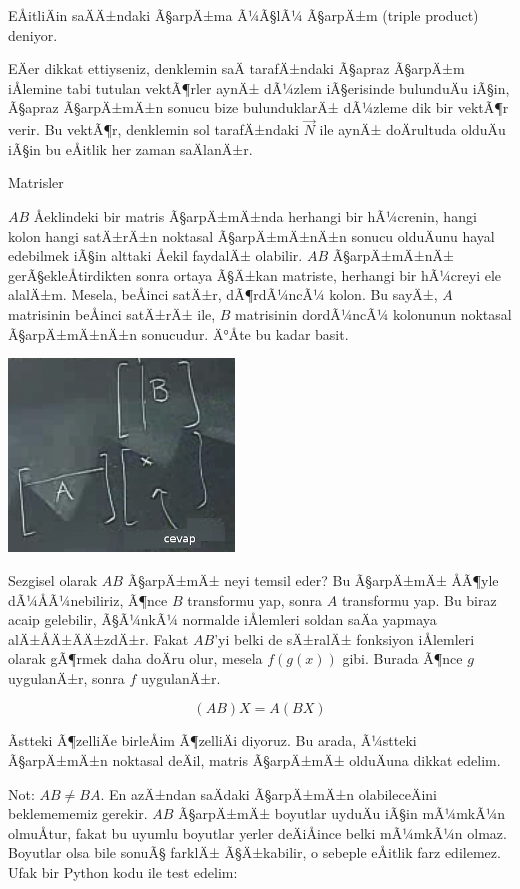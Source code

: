 \documentclass[12pt,fleqn]{article}\usepackage{../../common}
\begin{document}
EÅitliÄin saÄÄ±ndaki Ã§arpÄ±ma Ã¼Ã§lÃ¼ Ã§arpÄ±m (triple 
product) deniyor. 

EÄer dikkat ettiyseniz, denklemin saÄ tarafÄ±ndaki Ã§apraz 
Ã§arpÄ±m iÅlemine tabi 
tutulan vektÃ¶rler aynÄ± dÃ¼zlem iÃ§erisinde bulunduÄu iÃ§in, 
Ã§apraz Ã§arpÄ±mÄ±n sonucu 
bize bulunduklarÄ± dÃ¼zleme dik bir vektÃ¶r verir. Bu vektÃ¶r, denklemin 
sol 
tarafÄ±ndaki $\vec{N}$ ile aynÄ± doÄrultuda olduÄu iÃ§in bu 
eÅitlik her zaman 
saÄlanÄ±r.


Matrisler

$AB$ Åeklindeki bir matris Ã§arpÄ±mÄ±nda herhangi bir hÃ¼crenin, 
hangi kolon hangi
satÄ±rÄ±n noktasal Ã§arpÄ±mÄ±nÄ±n sonucu olduÄunu hayal edebilmek 
iÃ§in
alttaki Åekil faydalÄ± olabilir. $AB$ Ã§arpÄ±mÄ±nÄ± 
gerÃ§ekleÅtirdikten sonra ortaya 
Ã§Ä±kan matriste, herhangi bir hÃ¼creyi ele alalÄ±m. Mesela, beÅinci 
satÄ±r, dÃ¶rdÃ¼ncÃ¼ 
kolon. Bu sayÄ±, $A$ matrisinin beÅinci satÄ±rÄ± ile, $B$ matrisinin 
dordÃ¼ncÃ¼ 
kolonunun noktasal Ã§arpÄ±mÄ±nÄ±n sonucudur. Ä°Åte bu kadar basit.
\begin{center}
\includegraphics[width=6cm]{3_4.png}
\end{center}
Sezgisel olarak $AB$ Ã§arpÄ±mÄ± neyi temsil eder? Bu Ã§arpÄ±mÄ± 
ÅÃ¶yle
dÃ¼ÅÃ¼nebiliriz, Ã¶nce $B$ transformu yap, sonra $A$ transformu yap. Bu 
biraz
acaip gelebilir, Ã§Ã¼nkÃ¼ normalde iÅlemleri soldan saÄa yapmaya
alÄ±ÅÄ±ÄÄ±zdÄ±r. Fakat $AB$'yi belki de sÄ±ralÄ± fonksiyon 
iÅlemleri olarak
gÃ¶rmek daha doÄru olur, mesela $f(g(x))$ gibi. Burada Ã¶nce $g$ 
uygulanÄ±r,
sonra $f$ uygulanÄ±r. 

$$ (AB)X = A(BX) $$

Ãstteki Ã¶zelliÄe birleÅim Ã¶zelliÄi diyoruz. Bu arada, 
Ã¼stteki Ã§arpÄ±mÄ±n noktasal 
deÄil, matris Ã§arpÄ±mÄ±
olduÄuna dikkat edelim. 

Not: $AB \ne BA$. En azÄ±ndan saÄdaki Ã§arpÄ±mÄ±n olabileceÄini 
beklemememiz
gerekir. $AB$ Ã§arpÄ±mÄ± boyutlar uyduÄu iÃ§in mÃ¼mkÃ¼n 
olmuÅtur, fakat bu uyumlu
boyutlar yerler deÄiÅince belki mÃ¼mkÃ¼n olmaz. Boyutlar olsa bile 
sonuÃ§
farklÄ± Ã§Ä±kabilir, o sebeple eÅitlik farz edilemez. Ufak bir Python 
kodu ile
test edelim:
\end{document}
